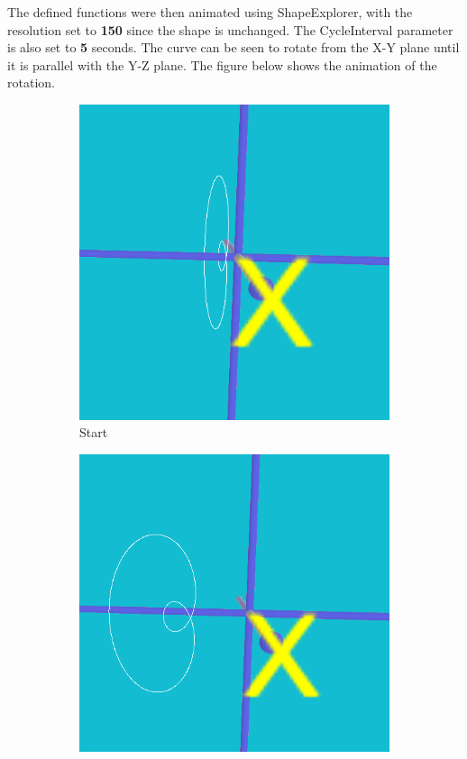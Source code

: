 \documentclass[acmlarge,nonacm=true]{acmart}
\begin{document}
The defined functions were then animated using ShapeExplorer, with the resolution set to \textbf{150}
since the shape is unchanged. The CycleInterval parameter is also set to \textbf{5} 
seconds. The curve can be seen to rotate from the X-Y plane until it is parallel with the Y-Z plane. 
The figure below shows the animation of the rotation.

\begin{figure}[H]
	\begin{subfigure}{.33\textwidth}
	  \centering
	  \includegraphics[width=.8\linewidth]{fig/2_start}
	  \caption{Start}
	\end{subfigure}%
	\begin{subfigure}{.33\textwidth}
	  \centering
	  \includegraphics[width=.8\linewidth]{fig/2_mid}

\end{subfigure}
\end{figure}
\end{document}
